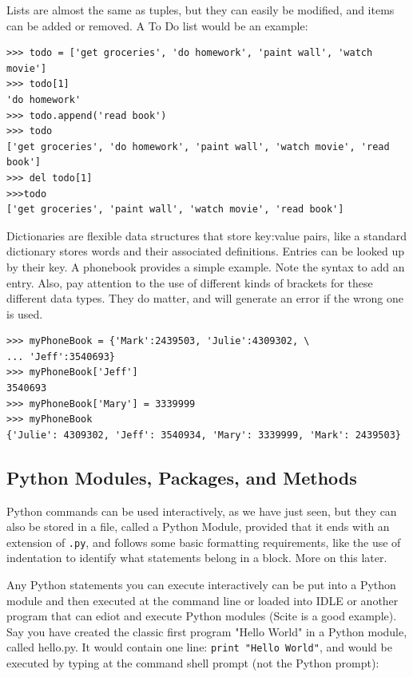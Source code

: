 Lists are almost the same as tuples, but they can easily be modified, and items can be added or removed. A To Do list would be an example:

\begin{verbatim}
>>> todo = ['get groceries', 'do homework', 'paint wall', 'watch movie']
>>> todo[1]
'do homework'
>>> todo.append('read book')
>>> todo
['get groceries', 'do homework', 'paint wall', 'watch movie', 'read book']
>>> del todo[1]
>>>todo
['get groceries', 'paint wall', 'watch movie', 'read book']
\end{verbatim}

Dictionaries are flexible data structures that store key:value pairs, like a standard dictionary stores words and their associated definitions.  Entries can be looked up by their key.  A phonebook provides a simple example.  Note the syntax to add an entry.  Also, pay attention to the use of different kinds of brackets for these different data types.  They do matter, and will generate an error if the wrong one is used.

\begin{verbatim}
>>> myPhoneBook = {'Mark':2439503, 'Julie':4309302, \
... 'Jeff':3540693}
>>> myPhoneBook['Jeff']
3540693
>>> myPhoneBook['Mary'] = 3339999
>>> myPhoneBook
{'Julie': 4309302, 'Jeff': 3540934, 'Mary': 3339999, 'Mark': 2439503}
\end{verbatim}

\subsection{Python Modules, Packages, and Methods}

Python commands can be used interactively, as we have just seen,  but they can also be stored in a file, called a Python Module, provided that it ends with an extension of \verb#.py#, and follows some basic formatting requirements, like the use of indentation to identify what statements belong in a block.  More on this later.

Any Python statements you can execute interactively can be put into a Python module and then executed at the command line or loaded into IDLE or another program that can ediot and execute Python modules (Scite is a good example).  Say you have created the classic first program "Hello World" in a Python module, called hello.py.  It would contain one line: \verb#print "Hello World"#, and would be executed by typing at the command shell prompt (not the Python prompt):


